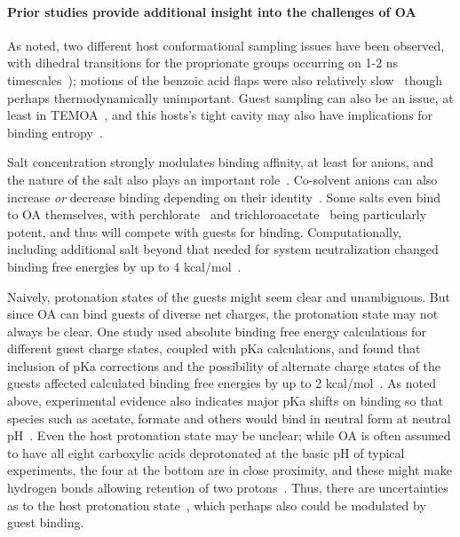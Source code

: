 \documentclass[aps,pre,twocolumn,nofootinbib,superscriptaddress,10pt, final,tightenlines]{revtex4-1}
\begin{document}
\paragraph{Prior studies provide additional insight into the challenges of OA}

As noted, two different host conformational sampling issues have been observed, with dihedral transitions for the proprionate groups occurring on 1-2 ns timescales~\cite{mikulskis_free-energy_2014}); motions of the benzoic acid flaps were also relatively slow~\cite{yin_sampl5_2016, tofoleanu_absolute_2016} though perhaps thermodynamically unimportant. 
Guest sampling can also be an issue, at least in TEMOA~\cite{yin_overview_2016}, and this hosts's tight cavity may also have implications for binding entropy~\cite{yin_sampl5_2016}.

Salt concentration strongly modulates binding affinity, at least for anions, and the nature of the salt also plays an important role~\cite{carnegie_anion_2014}. 
Co-solvent anions can also increase \emph{or} decrease binding depending on their identity~\cite{gibb_anion_2011}. 
Some salts even bind to OA themselves, with perchlorate~\cite{gibb_anion_2011} and trichloroacetate~\cite{sokkalingam_binding_2016} being particularly potent, and thus will compete with guests for binding.  
Computationally, including additional salt beyond that needed for system neutralization changed binding free energies by up to 4 kcal/mol~\cite{tofoleanu_absolute_2016}.  

Naively, protonation states of the guests might seem clear and unambiguous.
But since OA can bind guests of diverse net charges, the protonation state may not always be clear.  
One study used absolute binding free energy calculations for different guest charge states, coupled with pKa calculations, and found that inclusion of pKa corrections and the possibility of alternate charge states of the guests affected calculated binding free energies by up to 2 kcal/mol~\cite{tofoleanu_absolute_2016}. As noted above, experimental evidence also indicates major pKa shifts on binding so that species such as acetate, formate and others would bind in neutral form at neutral pH~\cite{wang_itc_2016, sokkalingam_binding_2016}. 
Even the host protonation state may be unclear; while OA is often assumed to have all eight carboxylic acids deprotonated at the basic pH of typical experiments, the four at the bottom are in close proximity, and these might make hydrogen bonds allowing retention of two protons~\cite{ewell_water_2008}.  
Thus, there are uncertainties as to the host protonation state~\cite{muddana_sampl4_2014, ewell_water_2008}, which perhaps also could be modulated by guest binding.  
\end{document}
